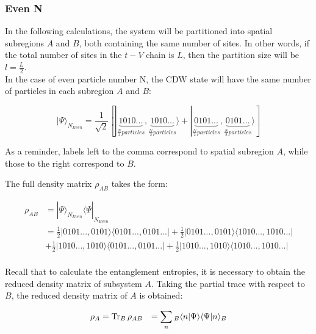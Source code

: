\begin{samepage}
	\subsubsection{Even N}
	In the following calculations, the system will be partitioned into spatial subregions $A$ and $B$, both containing the same number of sites. In other words, if the total number of sites in the $t-V$ chain is $L$, then the partition size will be $l=\frac{L}{2}$. \\
	
In the case of even particle number N, the CDW state will have the same number of particles in each subregion $A$ and $B$:

\begin{equation}
| \Psi \rangle_{N_{Even}} = \frac{1}{\sqrt{2}} [|\underbrace{1010...}_{\frac{N}{2} particles}, \underbrace{1010...}_{\frac{N}{2} particles} \rangle + |\underbrace{0101...}_{\frac{N}{2} particles}, \underbrace{0101...}_{\frac{N}{2} particles} \rangle ] 
\end{equation}

As a reminder, labels left to the comma correspond to spatial subregion $A$, while those to the right correspond to $B$.

The full density matrix $\rho_{AB}$ takes the form:

\begin{equation}
\begin{aligned}
\rho_{AB} &= | \Psi \rangle_{N_{Even}} \langle \Psi |_{N_{Even}} \\
&= \frac{1}{2} |0101...,0101\rangle \langle 0101...,0101... | + \frac{1}{2} |0101...,0101\rangle \langle 1010...,1010... |  \\
&+ \frac{1}{2} |1010...,1010\rangle \langle 0101...,0101... | + \frac{1}{2} |1010...,1010\rangle \langle 1010...,1010... |  \\
\end{aligned}
\label{eq:fullRho_EvenN}
\end{equation}

Recall that to calculate the entanglement entropies, it is necessary to obtain the reduced density matrix of subsystem $A$. Taking the partial trace with respect to $B$, the reduced density matrix of $A$ is obtained:

\begin{equation}
\begin{aligned}
\rho_{A} &= \operatorname{Tr}_{B} \rho_{AB} &= \sum_{n} {}_B \langle n | \Psi \rangle \langle \Psi | n \rangle_{B} \\
\end{aligned}
\end{equation}


\end{samepage}
